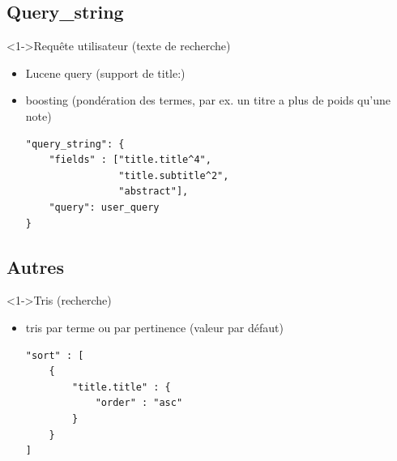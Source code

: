 \documentclass[hangout]{beamer}
\begin{document}

\subsection{Query\_string}
\begin{frame}[fragile]
	\begin{block}<1->{Requête utilisateur (texte de recherche)}
		\begin{itemize}
			\item Lucene query (support de title:)
			\item boosting (pondération des termes, par ex. un titre a plus de poids qu'une note)
		\begin{lstlisting}
"query_string": {
    "fields" : ["title.title^4", 
                "title.subtitle^2",
                "abstract"],
    "query": user_query
}
		\end{lstlisting}
		\end{itemize}
	\end{block}
\end{frame}

\subsection{Autres}

\begin{frame}[fragile]
	\begin{block}<1->{Tris (recherche)}
		\begin{itemize}
			\item tris par terme ou par \alert{pertinence} (valeur par défaut)
		\begin{lstlisting}
"sort" : [
    { 
	    "title.title" : {
            "order" : "asc"
        }
    }
]
		\end{lstlisting}
		\end{itemize}
	\end{block}
\end{frame}
\end{document}
